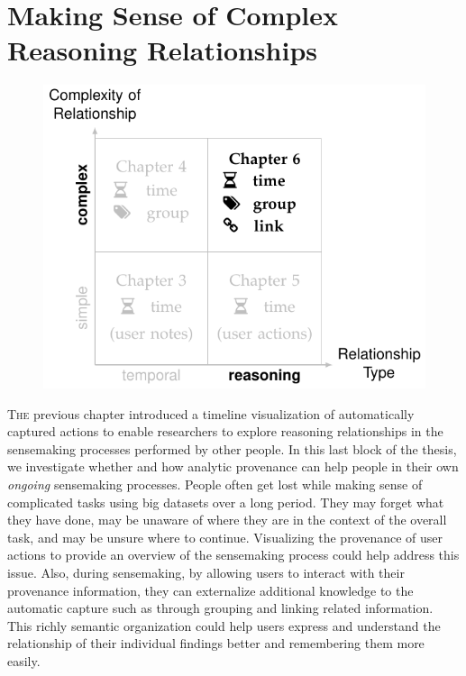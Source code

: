 \chapter{Making Sense of Complex Reasoning Relationships}
\label{chap:sensemap}

\graphicspath{{Chapter6/figures/}}

\begin{figure}[!h]
	\centering
	\includegraphics{work}
\end{figure}

\vspace{.8in}


\pagebreak

\lettrine{T}{he} previous chapter introduced a timeline visualization of automatically captured actions to enable researchers to explore reasoning relationships in the sensemaking processes performed by other people. In this last block of the thesis, we investigate whether and how analytic provenance can help people in their own \emph{ongoing} sensemaking processes. People often get lost while making sense of complicated tasks using big datasets over a long period. They may forget what they have done, may be unaware of where they are in the context of the overall task, and may be unsure where to continue. Visualizing the provenance of user actions to provide an overview of the sensemaking process could help address this issue. Also, during sensemaking, by allowing users to interact with their provenance information, they can externalize additional knowledge to the automatic capture such as through grouping and linking related information. This richly semantic organization could help users express and understand the relationship of their individual findings better and remembering them more easily.

